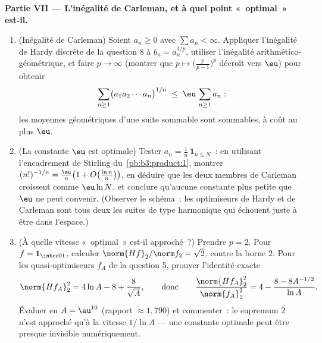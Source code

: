 \begin{problem}
\medskip
\noindent\textbf{Partie VII --- L'inégalité de Carleman, et
à quel point «~optimal~» est-il.}
\begin{enumerate}[resume]
  \item (Inégalité de Carleman) Soient $a_n \geq 0$ avec
        $\sum a_n < \infty$. Appliquer l'inégalité de Hardy
        discrète de la question 8 à $b_n = a_n^{1/p}$,
        utiliser l'inégalité arithmético-géométrique, et
        faire $p \to \infty$ (montrer que $p \mapsto
        \bigl(\frac p{p-1}\bigr)^p$ décroît vers $\eu$) pour
        obtenir
        \[
        \sum_{n\geq1}\bigl(a_1a_2\cdots a_n\bigr)^{1/n}
        \;\leq\; \eu\,\sum_{n\geq1}a_n :
        \]
        les moyennes géométriques d'une suite sommable sont
        sommables, à coût au plus $\eu$.
  \item (La constante $\eu$ est optimale) Tester $a_n =
        \frac1n\,\mathbf 1_{n\leq N}$~: en utilisant
        l'encadrement de Stirling
        du~\cref{pb:b3:product:1}, montrer
        $(n!)^{-1/n} = \frac\eu n\bigl(1 +
        O\bigl(\frac{\ln n}n\bigr)\bigr)$, en déduire que
        les deux membres de Carleman croissent comme
        $\eu\ln N$, et conclure qu'aucune constante plus
        petite que $\eu$ ne peut convenir. (Observer le
        schéma~: les optimiseurs de Hardy et de Carleman
        sont tous deux les suites de type harmonique qui
        échouent juste à être dans l'espace.)
  \item (À quelle vitesse «~optimal~» est-il approché~?)
        Prendre $p = 2$. Pour $f = \mathbf 1_{\intcc01}$,
        calculer $\norm{Hf}_2/\norm f_2 = \sqrt2$, contre
        la borne $2$. Pour les quasi-optimiseurs $f_A$ de
        la question 5, prouver l'identité exacte
        \[
        \norm{Hf_A}_2^2 = 4\ln A - 8 + \frac{8}{\sqrt A},
        \qquad\text{donc}\qquad
        \frac{\norm{Hf_A}_2^2}{\norm{f_A}_2^2}
        = 4 - \frac{8 - 8A^{-1/2}}{\ln A} .
        \]
        Évaluer en $A = \eu^{10}$ (rapport $\approx 1{,}790$)
        et commenter~: le supremum $2$ n'est approché qu'à
        la vitesse $1/\ln A$ --- une constante optimale
        peut être presque invisible numériquement.
\end{enumerate}
\end{problem}

